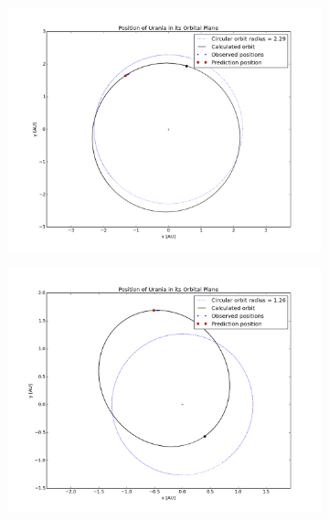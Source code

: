 \documentclass[a4paper,12pt]{article}
\begin{document}
\begin{figure}[!htbp]
\centering
\begin{subfigure}{0.5\textwidth}
  \centering
  \includegraphics[width=\linewidth]{JPLOrbitalPlane.png}
  \caption{}
  \label{fig:sub1}
\end{subfigure}%
\begin{subfigure}{0.5\textwidth}
  \centering
  \includegraphics[width=\linewidth]{UraniaOrbitalPlane.png}
  \caption{}
  \label{fig:sub2}
\end{subfigure}
\caption{}
\label{fig:failedFS}
\end{figure}




\end{document}

